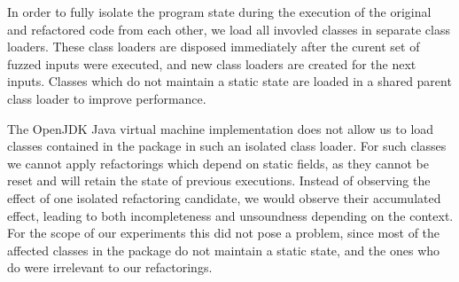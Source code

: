 \documentclass[sigconf,review,anonymous]{acmart}
\begin{document}
In order to fully isolate the program state during the execution of the original
and refactored code from each other, we load all invovled classes in separate
class loaders. These class loaders are disposed immediately after the curent set
of fuzzed inputs were executed, and new class loaders are created for the next
inputs. Classes which do not maintain a static state are loaded in a shared
parent class loader to improve performance.

The OpenJDK Java virtual machine implementation does not allow us to load
classes contained in the  package in such an isolated class
loader. For such classes we cannot apply refactorings which depend on static
fields, as they cannot be reset and will retain the state of previous
executions. Instead of observing the effect of one isolated refactoring
candidate, we would observe their accumulated effect, leading to both
incompleteness and unsoundness depending on the context. For the scope of our
experiments this did not pose a problem, since most of the affected classes in
the  package do not maintain a static state, and the ones who do
were irrelevant to our refactorings.





\end{document}

